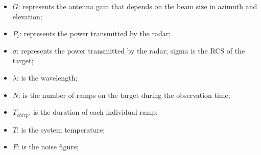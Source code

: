 \begin{itemize}
    \item \textbf{$G$}: represents the antenna gain that depends on the beam size in azimuth and elevation;
    
    \item \textbf{$P_{t}$}: represents the power transmitted by the radar;
         
    \item \textbf{$\sigma$}: represents the power transmitted by the radar; sigma is the RCS of the target;
    
    \item \textbf{$\lambda$}: is the wavelength;
    
    \item \textbf{$N$}: is the number of ramps on the target during the observation time;
    
    \item \textbf{$T_{chirp}$}: is the duration of each individual ramp;
    
    \item \textbf{$T$}:  is the system temperature;
    
    \item \textbf{$F$}:  is the noise figure;


\end{itemize}


